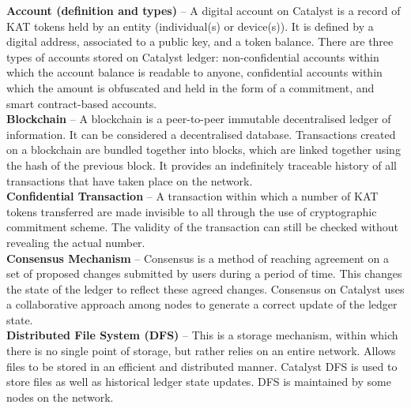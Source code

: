\textbf{Account (definition and types)} – A digital account on Catalyst is a record of KAT tokens held by an entity (individual(s) or device(s)). It is defined by a digital address, associated to a public key, and a token balance. There are three types of accounts stored on Catalyst ledger: non-confidential accounts within which the account balance is readable to anyone, confidential accounts within which the amount is obfuscated and held in the form of a commitment, and smart contract-based accounts. \\
		

\textbf{Blockchain} – A blockchain is a peer-to-peer immutable decentralised ledger of information. It can be considered a decentralised database. Transactions created on a blockchain are bundled together into blocks, which are linked together using the hash of the previous block. It provides an indefinitely traceable history of all transactions that have taken place on the network.\\

\textbf{Confidential Transaction} – A transaction within which a number of KAT tokens transferred are made invisible to all through the use of cryptographic commitment scheme. The validity of the transaction can still be checked without revealing the actual number. \\

\textbf{Consensus Mechanism} – Consensus is a method of reaching agreement on a set of proposed changes submitted by users during a period of time. This changes the state of the ledger to reflect these agreed changes. Consensus on Catalyst uses a collaborative approach among nodes to generate a correct update of the ledger state.\\

\textbf{Distributed File System (DFS)} – This is a storage mechanism, within which there is no single point of storage, but rather relies on an entire network. Allows files to be stored in an efficient and distributed manner. Catalyst DFS is used to store files as well as historical ledger state updates. DFS is maintained by some nodes on the network. \\

